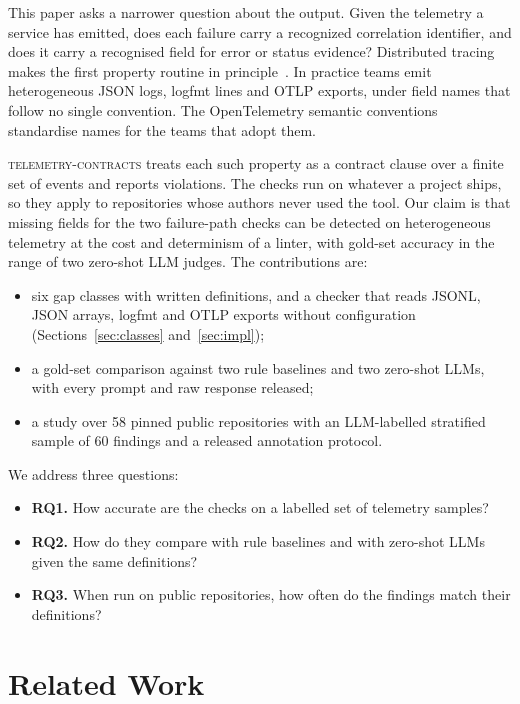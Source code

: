 \documentclass[conference]{IEEEtran}
\newcommand{\tool}{\textsc{telemetry-contracts}\xspace}
\begin{document}
This paper asks a narrower question about the output. Given the telemetry a service has emitted, does each failure carry a recognized correlation identifier, and does it carry a recognised field for error or status evidence? Distributed tracing makes the first property routine in principle~\cite{sigelman2010dapper}. In practice teams emit heterogeneous JSON logs, logfmt lines and OTLP exports, under field names that follow no single convention. The OpenTelemetry semantic conventions~\cite{otel-semconv} standardise names for the teams that adopt them.

\tool treats each such property as a contract clause over a finite set of events and reports violations. The checks run on whatever a project ships, so they apply to repositories whose authors never used the tool. Our claim is that missing fields for the two failure-path checks can be detected on heterogeneous telemetry at the cost and determinism of a linter, with gold-set accuracy in the range of two zero-shot LLM judges. The contributions are:
\begin{itemize}
\item six gap classes with written definitions, and a checker that reads JSONL, JSON arrays, logfmt and OTLP exports without configuration (Sections~\ref{sec:classes} and~\ref{sec:impl});
\item a gold-set comparison against two rule baselines and two zero-shot LLMs, with every prompt and raw response released;
\item a study over 58 pinned public repositories with an LLM-labelled stratified sample of 60 findings and a released annotation protocol.
\end{itemize}

We address three questions:
\begin{itemize}
\item \textbf{RQ1.} How accurate are the checks on a labelled set of telemetry samples?
\item \textbf{RQ2.} How do they compare with rule baselines and with zero-shot LLMs given the same definitions?
\item \textbf{RQ3.} When run on public repositories, how often do the findings match their definitions?
\end{itemize}

\section{Related Work}
\end{document}
